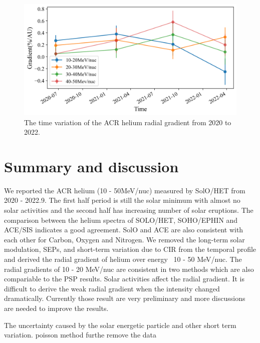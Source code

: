\begin{figure}[!htb]
    \centering
    \includegraphics[width = \textwidth, height = 0.3\textheight]{images/ACR/timevariation_normalmask_gradient.png}
    \caption[The time variation of the \ac{ACR} helium radial gradient]{The time variation of the \ac{ACR} helium radial gradient from 2020 to 2022. }
    \label{fig:radialgradient_time_variation}
\end{figure}



\section{ Summary and discussion}

We reported the ACR helium (10 - 50MeV/nuc) measured by SolO/HET from 2020 - 2022.9. The first half period is still the solar minimum with almost no solar activities and the second half has increasing number of solar eruptions.
The comparison between the helium spectra of SOLO/HET, SOHO/EPHIN and ACE/SIS indicates a good agreement. SolO and ACE are also consistent with each other for Carbon, Oxygen and Nitrogen.
We removed the long-term solar modulation, SEPs, and short-term variation due to CIR from the temporal profile and derived the radial gradient of helium over energy ~10 - 50 MeV/nuc.
The radial gradients of 10 - 20 MeV/nuc are consistent in two methods which are also compariable to the PSP results.
Solar activities affect the radial gradient. It is difficult to derive the weak radial gradient when the intensity changed dramatically.
Currently those result are very preliminary and more discussions are needed to improve the results.

The uncertainty caused by the solar energetic particle and other short term variation.
poisson method furthe remove the data

